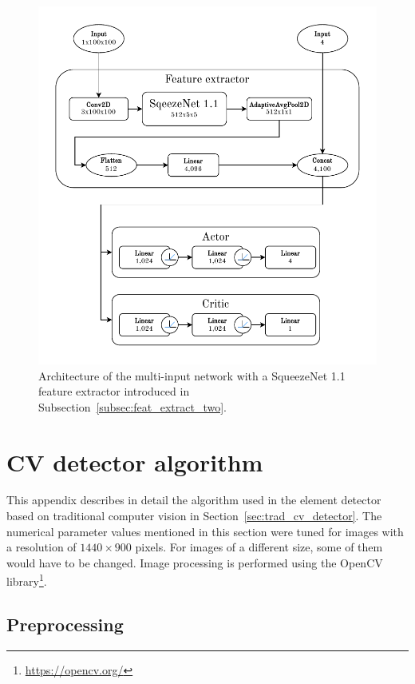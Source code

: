 \documentclass[
  digital,     %
  oneside,     %
  nosansbold,  %
  nocolorbold, %
  lof,         %
  lot,         %
]{fithesis4}
\begin{document}
\begin{figure}
    \includegraphics[width=1\linewidth]{diagrams/squeezenet.pdf}
    \caption{Architecture of the multi-input network with a SqueezeNet 1.1 feature extractor introduced in Subsection~\ref{subsec:feat_extract_two}.}
    \label{fig:squeezenet_arch}
\end{figure}

\chapter{CV detector algorithm}
\label{ap:cv}

This appendix describes in detail the algorithm used in the element detector based on traditional computer vision in Section~\ref{sec:trad_cv_detector}. The numerical parameter values mentioned in this section were tuned for images with a resolution of $1440\times900$ pixels. For images of a different size, some of them would have to be changed. Image processing is performed using the OpenCV library\footnote{\url{https://opencv.org/}}.

\section{Preprocessing}
\end{document}
